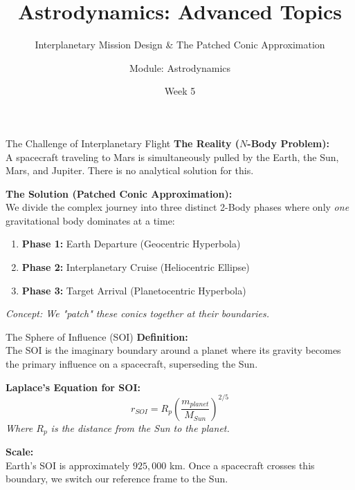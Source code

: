 \documentclass[11pt]{beamer}
\title[Interplanetary Mission Design]{Astrodynamics: Advanced Topics}
\subtitle{Interplanetary Mission Design \& The Patched Conic Approximation}
\author{Module: Astrodynamics}
\date{Week 5}
\begin{document}
\begin{frame}
    \titlepage
\end{frame}

\begin{frame}{The Challenge of Interplanetary Flight}
    \textbf{The Reality ($N$-Body Problem):} \\
    A spacecraft traveling to Mars is simultaneously pulled by the Earth, the Sun, Mars, and Jupiter. There is no analytical solution for this.
    
    \vspace{0.5cm}
    \textbf{The Solution (Patched Conic Approximation):} \\
    We divide the complex journey into three distinct 2-Body phases where only \textit{one} gravitational body dominates at a time:
    \begin{enumerate}
        \item \textbf{Phase 1:} Earth Departure (Geocentric Hyperbola)
        \item \textbf{Phase 2:} Interplanetary Cruise (Heliocentric Ellipse)
        \item \textbf{Phase 3:} Target Arrival (Planetocentric Hyperbola)
    \end{enumerate}
    
    \vspace{0.3cm}
    \textit{Concept: We "patch" these conics together at their boundaries.}
\end{frame}

\begin{frame}{The Sphere of Influence (SOI)}
    \textbf{Definition:} \\
    The SOI is the imaginary boundary around a planet where its gravity becomes the primary influence on a spacecraft, superseding the Sun.
    
    \vspace{0.5cm}
    \textbf{Laplace's Equation for SOI:}
    \begin{equation}
        r_{SOI} = R_p \left( \frac{m_{planet}}{M_{Sun}} \right)^{2/5}
    \end{equation}
    \textit{Where $R_p$ is the distance from the Sun to the planet.}
    
    \vspace{0.5cm}
    \textbf{Scale:} \\
    Earth's SOI is approximately $925,000$ km. Once a spacecraft crosses this boundary, we switch our reference frame to the Sun.
\end{frame}
\end{document}
